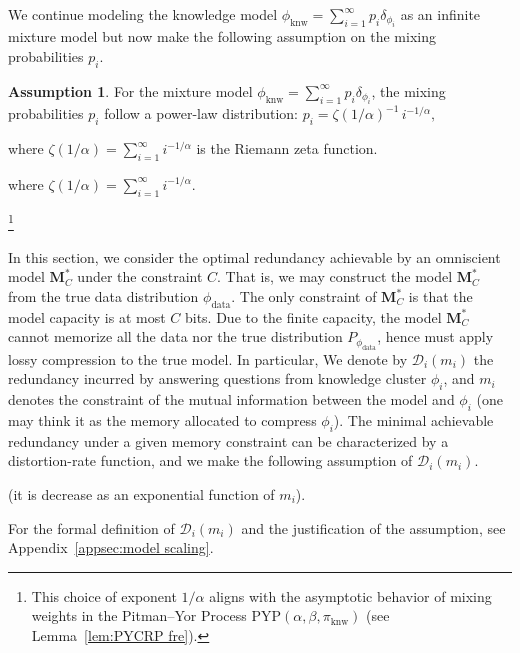 \documentclass[11pt]{article}
\theoremstyle{plain}
\theoremstyle{definition}
\newtheorem{assumption}[theorem]{Assumption}
\newcommand{\capacity}{C}
\newcommand{\Model}{\boldsymbol{M}}
\newcommand{\dataModel}{\phi_{\text{data}}}
\newcommand{\knwModel}{\phi_{\text{knw}}}
\newcommand{\basemeasure}{\pi_{\text{knw}}}
\newcommand{\ratedistortion}{\mathcal{D}}
\begin{document}
We continue modeling the knowledge model \( \knwModel = \sum_{i=1}^{\infty} p_i \delta_{\phi_i} \) as an infinite mixture model but now make the following assumption on the mixing probabilities \( p_i \). 

\begin{assumption}
\label{ass:powerlaw}
For the mixture model \( \knwModel = \sum_{i=1}^{\infty} p_i \delta_{\phi_i} \), the mixing probabilities \( p_i \) 
follow a power-law distribution:
$
p_i = \zeta(1/\alpha)^{-1} \, i^{-1/\alpha},
$
\begin{arxiv}
where \( \zeta(1/\alpha) = \sum_{i=1}^{\infty} i^{-1/\alpha} \) is the Riemann zeta function.
\end{arxiv}
\begin{nips}
where \( \zeta(1/\alpha) = \sum_{i=1}^{\infty} i^{-1/\alpha} \).
\end{nips}
\footnote{
This choice of exponent \(1/\alpha\) aligns with the asymptotic behavior of mixing weights in the Pitman–Yor Process \( \mathrm{PYP}(\alpha, \beta, \basemeasure) \) (see Lemma~\ref{lem:PYCRP fre}). 
}
\end{assumption}
In this section, we consider the optimal redundancy achievable by an omniscient model \( \Model^*_\capacity \) under the constraint $\capacity$. That is, we may construct the model \( \Model^*_\capacity \) from the true data distribution \( \dataModel \). The only constraint of 
\( \Model^*_\capacity \) is that the model capacity is at most $\capacity$ bits.
Due to the finite capacity, the model 
\( \Model^*_\capacity \) 
cannot memorize all the data nor the true distribution
\( P_{\dataModel} \), hence
must apply lossy compression to the true model.
In particular, We denote by 
$\ratedistortion_i(m_i)$
the redundancy incurred by answering questions from knowledge cluster $\phi_i$, and \( m_i \) denotes the constraint of the mutual information between
the model and $\phi_i$ (one may think it as the memory allocated to compress \( \phi_i \)).  
The minimal achievable redundancy under a given memory constraint can be characterized by a distortion-rate function, and we make the following assumption of  
$\ratedistortion_i(m_i)$.
\begin{arxiv}
(it is decrease as an exponential function of $m_i$).
\end{arxiv}
For the formal definition of 
$\ratedistortion_i(m_i)$
and the justification of 
the assumption, see Appendix~\ref{appsec:model scaling}.
\end{document}
